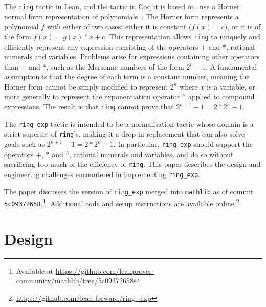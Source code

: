 \documentclass{llncs}
\newcommand{\Q}{\mathbb{Q}}
\newcommand{\lean}[1]{\texttt{#1}\xspace} %
\newcommand{\pow}{{${}^\wedge$}\xspace}
\newcommand{\ring}{\lean{ring}}
\newcommand{\ringexp}{\lean{ring\_exp}}
\begin{document}
The \lean{ring} tactic in Lean, and the tactic in Coq it is based on,
use a Horner normal form representation of polynomials~\cite{ring-tactic}.
The Horner form represents a polynomial $f$ with either of two cases:
either it is constant ($f(x) = c$), or it is of the form $f(x) = g(x) * x + c$.
This representation
allows \lean{ring} to uniquely and efficiently represent any expression consisting of the operators $+$ and $*$, rational numerals and variables.
Problems arise for expressions containing other operators than $+$ and $*$,
such as the Mersenne numbers of the form $2^n - 1$.
A fundamental assumption is that the degree of each term is a constant number,
meaning the Horner form cannot be simply modified to represent $2^n$ where $x$ is a variable,
or more generally to represent the exponentiation operator \pow applied to compound expressions.
The result is that \ring cannot prove that $2^{n+1} - 1 = 2 * 2^n - 1$.


The \ringexp tactic is intended to be a normalisation tactic whose domain is a strict superset of \lean{ring}'s,
making it a drop-in replacement that can also solve goals such as $2^{n+1} - 1 = 2 * 2^n - 1$.
In particular, \ringexp should support the operators $+$, $*$ and \pow, rational numerals and variables,
and do so without sacrificing too much of the efficiency of \lean{ring}.
This paper describes the design and engineering challenges encountered in implementing \ringexp.

The paper discusses the version of \ringexp merged into \texttt{mathlib} as of commit \texttt{5c09372658}.\footnote{Available at \url{https://github.com/leanprover-community/mathlib/tree/5c09372658}}.
Additional code and setup instructions are available online.\footnote{\url{https://github.com/lean-forward/ring_exp}}

\section{Design}
\end{document}
